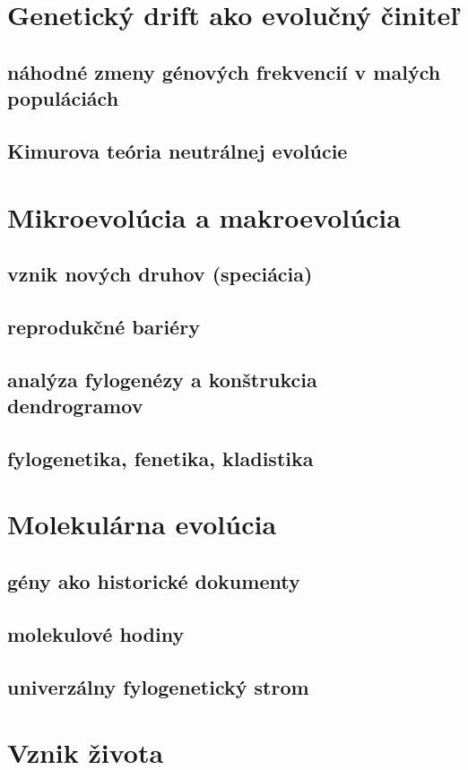 \section{Genetický drift ako evolučný činiteľ}
\subsection{náhodné zmeny génových frekvencií v malých populáciách}
\subsection{Kimurova teória neutrálnej evolúcie}

\section{Mikroevolúcia a makroevolúcia}
\subsection{vznik nových druhov (speciácia)}
\subsection{reprodukčné bariéry}
\subsection{analýza fylogenézy a konštrukcia dendrogramov}
\subsection{fylogenetika, fenetika, kladistika}

\section{Molekulárna evolúcia}
\subsection{gény ako historické dokumenty}
\subsection{molekulové hodiny}
\subsection{univerzálny fylogenetický strom}

\section{Vznik života}
